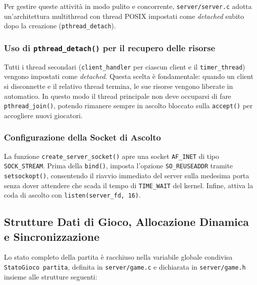 \documentclass[11pt,a4paper]{article}
\begin{document}
Per gestire queste attività in modo pulito e concorrente, \texttt{server/server.c} adotta un'architettura multithread con thread POSIX impostati come \textit{detached} subito dopo la creazione (\texttt{pthread\_detach}).


\subsubsection{Uso di \texttt{pthread\_detach()} per il recupero delle risorse}
Tutti i thread secondari (\texttt{client\_handler} per ciascun client e il \texttt{timer\_thread}) vengono impostati come \textit{detached}. Questa scelta è fondamentale: quando un client si disconnette e il relativo thread termina, le sue risorse vengono liberate in automatico. In questo modo il thread principale non deve occuparsi di fare \texttt{pthread\_join()}, potendo rimanere sempre in ascolto bloccato sulla \texttt{accept()} per accogliere nuovi giocatori.

\subsubsection{Configurazione della Socket di Ascolto}
La funzione \texttt{create\_server\_socket()} apre una socket \texttt{AF\_INET} di tipo \texttt{SOCK\_STREAM}. Prima della \texttt{bind()}, imposta l'opzione \texttt{SO\_REUSEADDR} tramite \texttt{setsockopt()}, consentendo il riavvio immediato del server sulla medesima porta senza dover attendere che scada il tempo di \texttt{TIME\_WAIT} del kernel. Infine, attiva la coda di ascolto con \texttt{listen(server\_fd, 16)}.

\subsection{Strutture Dati di Gioco, Allocazione Dinamica e Sincronizzazione}

Lo stato completo della partita è racchiuso nella variabile globale condivisa \texttt{StatoGioco partita}, definita in \texttt{server/game.c} e dichiarata in \texttt{server/game.h} insieme alle strutture seguenti:
\end{document}

